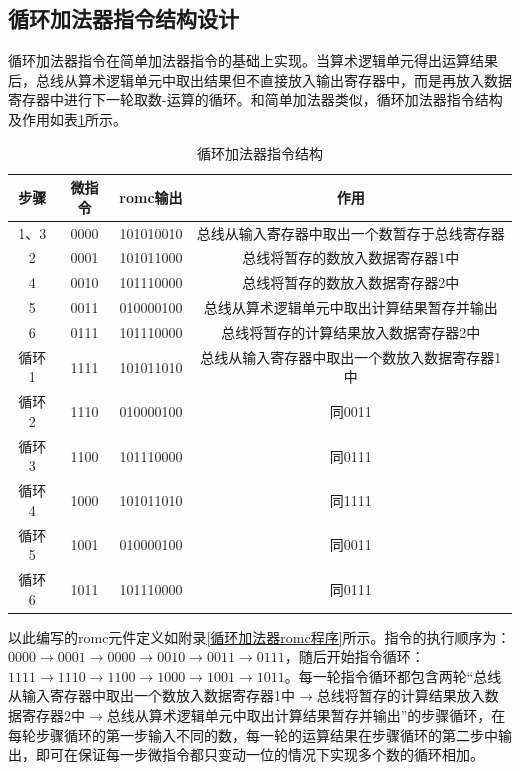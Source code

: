 \documentclass[a4paper]{ctexart}
\begin{document}
\begin{spacing}{1.3}
	\subsection{循环加法器指令结构设计}\label{循环加法器指令结构}
	循环加法器指令在简单加法器指令的基础上实现。当算术逻辑单元得出运算结果后，总线从算术逻辑单元中取出结果但不直接放入输出寄存器中，而是再放入数据寄存器中进行下一轮取数-运算的循环。和简单加法器类似，循环加法器指令结构及作用如表\ref{tab:循环加法器指令结构}所示。

	\begin{table}[htbp]
		\centering
		\caption{循环加法器指令结构}\label{tab:循环加法器指令结构}
		\begin{tabular}{|c|c|c|c|}
			\hline
			步骤&微指令&romc输出&作用\\\hline
			1、3&0000&101010010&总线从输入寄存器中取出一个数暂存于总线寄存器\\\hline
			2&0001&101011000&总线将暂存的数放入数据寄存器1中\\\hline
			4&0010&101110000&总线将暂存的数放入数据寄存器2中\\\hline
			5&0011&010000100&总线从算术逻辑单元中取出计算结果暂存并输出\\\hline
			6&0111&101110000&总线将暂存的计算结果放入数据寄存器2中\\\hline
			循环1&1111&101011010&总线从输入寄存器中取出一个数放入数据寄存器1中\\\hline
			循环2&1110&010000100&同0011\\\hline
			循环3&1100&101110000&同0111\\\hline
			循环4&1000&101011010&同1111\\\hline
			循环5&1001&010000100&同0011\\\hline
			循环6&1011&101110000&同0111\\\hline
		\end{tabular}
	\end{table}

	以此编写的romc元件定义如附录\ref{循环加法器romc程序}所示。指令的执行顺序为：$0000\rightarrow 0001\rightarrow 0000\rightarrow 0010\rightarrow 0011\rightarrow 0111$，随后开始指令循环：$1111\rightarrow 1110\rightarrow 1100\rightarrow 1000\rightarrow 1001\rightarrow 1011$。每一轮指令循环都包含两轮“总线从输入寄存器中取出一个数放入数据寄存器1中$\rightarrow$总线将暂存的计算结果放入数据寄存器2中$\rightarrow$总线从算术逻辑单元中取出计算结果暂存并输出”的步骤循环，在每轮步骤循环的第一步输入不同的数，每一轮的运算结果在步骤循环的第二步中输出，即可在保证每一步微指令都只变动一位的情况下实现多个数的循环相加。


\end{spacing}
\end{document}
